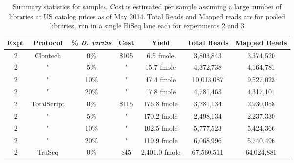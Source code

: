 
\begin{table}[htdp]

\caption{Summary statistics for samples. Cost is estimated per sample assuming a
     large number of libraries at US catalog prices as of May 2014. Total Reads
     and Mapped reads are for pooled libraries, run in a single HiSeq lane each
     for experiments 2 and 3}
\begin{center}
\begin{tabular}{|c|c|c|c|c|c|c|} \hline
      Expt & Protocol & \% {\em D. virilis} & Cost &  Yield & Total Reads & Mapped Reads \\\hline 
2 & Clontech & 0\% & \$105 & 6.5 fmole & 3,803,843 &3,374,520 \\
2 & " & 5\% & " & 15.7 fmole & 4,372,738 &4,164,781 \\
2 & " & 10\% & " & 47.4 fmole & 10,013,087 &9,527,023 \\
2 & " & 20\% & " & 17.8 fmole & 4,781,463 &4,317,101 \\
2 & TotalScript & 0\% & \$115 & 176.8 fmole & 3,281,134 &2,930,058 \\
2 & " & 5\% & " & 170.2 fmole & 2,498,134 &2,237,330 \\
2 & " & 10\% & " & 102.5 fmole & 5,777,523 &5,424,366 \\
2 & " & 20\% & " & 119.9 fmole & 6,068,996 &5,740,496 \\
2 & TruSeq & 0\% & \$45 & 2,401.0 fmole & 67,560,511 &64,024,881 \\

\end{tabular}
\end{center}
\end{table}

